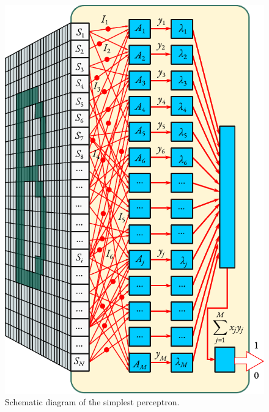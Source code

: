 \begin{figure}[ht]
 \centering
 \includegraphics[width=.68\tfwidth]{figures/perceptron2.pdf}
\caption{Schematic diagram of the simplest perceptron.\label{perceptron2}}
 \end{figure}
 
